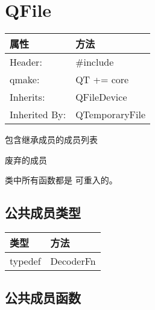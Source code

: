 \chapter{QFile}

\begin{tabular}{|l|l|}
\hline
属性 	&方法\\
\hline
Header: &	\#include\\
\hline
qmake: &	QT += core\\
\hline
Inherits: &	QFileDevice\\
\hline
Inherited By:& 	QTemporaryFile\\
\hline
\end{tabular}

\begin{compactitem}
\item 包含继承成员的成员列表
\item 废弃的成员
\end{compactitem}

\begin{notice}
	类中所有函数都是 可重入的。
\end{notice}
 
\splitLine

\section{公共成员类型}

\begin{tabular}{|l|l|}
\hline
类型& 	方法\\
\hline
typedef& 	DecoderFn \\
\hline
\end{tabular}

\splitLine

\section{公共成员函数}


